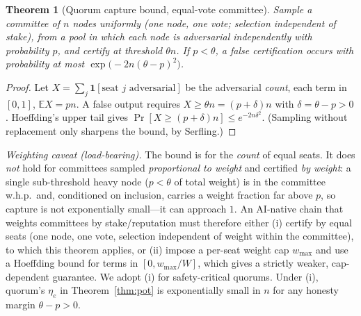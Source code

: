 \documentclass[11pt]{article}
\newtheorem{theorem}{Theorem}
\begin{document}
\begin{theorem}[Quorum capture bound, equal-vote committee]
\label{thm:quorum}
Sample a committee of $n$ nodes \emph{uniformly} (one node, one vote; selection independent of stake), from a pool in which each node is adversarial independently with probability $p$, and certify at threshold $\theta n$. If $p<\theta$, a false certification occurs with probability at most $\exp\!\big(-2n(\theta-p)^2\big)$.
\end{theorem}
\begin{proof}
Let $X=\sum_{j}\mathbf 1[\text{seat }j\text{ adversarial}]$ be the adversarial \emph{count}, each term in $[0,1]$, $\mathbb{E}X=pn$. A false output requires $X\ge\theta n=(p+\delta)n$ with $\delta=\theta-p>0$. Hoeffding's upper tail gives $\Pr[X\ge(p+\delta)n]\le e^{-2n\delta^2}$. (Sampling without replacement only sharpens the bound, by Serfling.)
\end{proof}

\noindent\emph{Weighting caveat (load-bearing).} The bound is for the \emph{count} of equal seats. It does \emph{not} hold for committees sampled \emph{proportional to weight} and certified \emph{by weight}: a single sub-threshold heavy node ($p<\theta$ of total weight) is in the committee w.h.p.\ and, conditioned on inclusion, carries a weight fraction far above $p$, so capture is not exponentially small---it can approach $1$. An AI-native chain that weights committees by stake/reputation must therefore either (i) certify by equal seats (one node, one vote, selection independent of weight within the committee), to which this theorem applies, or (ii) impose a per-seat weight cap $w_{\max}$ and use a Hoeffding bound for terms in $[0,w_{\max}/W]$, which gives a strictly weaker, cap-dependent guarantee. We adopt (i) for safety-critical quorums. Under (i), quorum's $\eta_e$ in Theorem~\ref{thm:pot} is exponentially small in $n$ for any honesty margin $\theta-p>0$.
\end{document}
